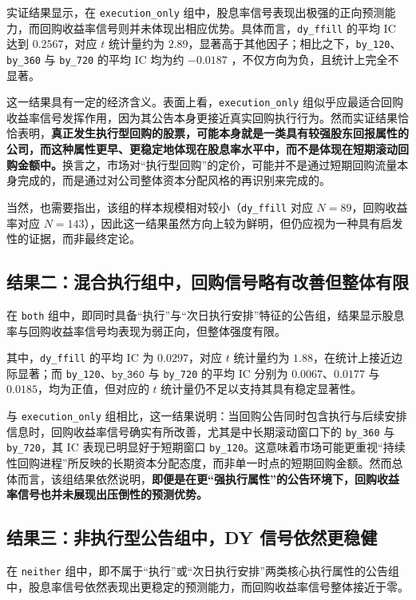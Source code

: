 \documentclass[a4paper,10pt]{article}
\begin{document}
实证结果显示，在 \texttt{execution\_only} 组中，股息率信号表现出极强的正向预测能力，而回购收益率信号则并未体现出相应优势。具体而言，\texttt{dy\_ffill} 的平均 IC 达到 $0.2567$，对应 $t$ 统计量约为 $2.89$，显著高于其他因子；相比之下，\texttt{by\_120}、\texttt{by\_360} 与 \texttt{by\_720} 的平均 IC 均为约 $-0.0187$ ，不仅方向为负，且统计上完全不显著。

这一结果具有一定的经济含义。表面上看，\texttt{execution\_only} 组似乎应最适合回购收益率信号发挥作用，因为其公告本身更接近真实回购执行行为。然而实证结果恰恰表明，\textbf{真正发生执行型回购的股票，可能本身就是一类具有较强股东回报属性的公司，而这种属性更早、更稳定地体现在股息率水平中，而不是体现在短期滚动回购金额中。}换言之，市场对“执行型回购”的定价，可能并不是通过短期回购流量本身完成的，而是通过对公司整体资本分配风格的再识别来完成的。

当然，也需要指出，该组的样本规模相对较小（\texttt{dy\_ffill} 对应 $N=89$，回购收益率对应 $N=143$），因此这一结果虽然方向上较为鲜明，但仍应视为一种具有启发性的证据，而非最终定论。

\subsection{结果二：混合执行组中，回购信号略有改善但整体有限}

在 \texttt{both} 组中，即同时具备“执行”与“次日执行安排”特征的公告组，结果显示股息率与回购收益率信号均表现为弱正向，但整体强度有限。

其中，\texttt{dy\_ffill} 的平均 IC 为 $0.0297$，对应 $t$ 统计量约为 $1.88$，在统计上接近边际显著；而 \texttt{by\_120}$、\texttt{by\_360}$ 与 \texttt{by\_720} 的平均 IC 分别为 $0.0067$、$0.0177$ 与 $0.0185$，均为正值，但对应的 $t$ 统计量仍不足以支持其具有稳定显著性。

与 \texttt{execution\_only} 组相比，这一结果说明：当回购公告同时包含执行与后续安排信息时，回购收益率信号确实有所改善，尤其是中长期滚动窗口下的 \texttt{by\_360} 与 \texttt{by\_720}，其 IC 表现已明显好于短期窗口 \texttt{by\_120}。这意味着市场可能更重视“持续性回购进程”所反映的长期资本分配态度，而非单一时点的短期回购金额。然而总体而言，该组结果依然说明，\textbf{即便是在更“强执行属性”的公告环境下，回购收益率信号也并未展现出压倒性的预测优势。}

\subsection{结果三：非执行型公告组中，DY 信号依然更稳健}

在 \texttt{neither} 组中，即不属于“执行”或“次日执行安排”两类核心执行属性的公告组中，股息率信号依然表现出更稳定的预测能力，而回购收益率信号整体接近于零。
\end{document}
